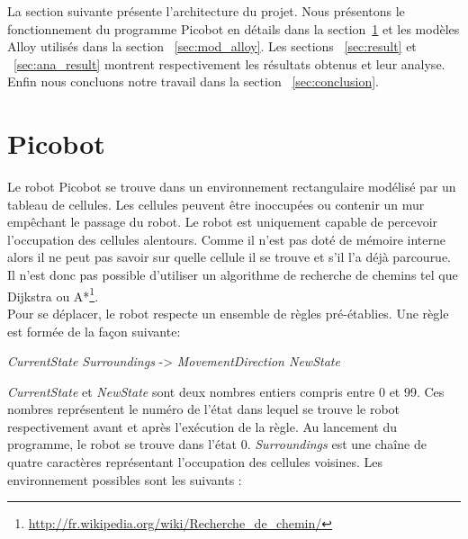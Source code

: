\documentclass{article}
\begin{document}
La section suivante présente l’architecture du projet. Nous présentons le fonctionnement du programme Picobot en détails dans la section~\ref{sec:picobot} et les modèles Alloy utilisés dans la section ~\ref{sec:mod_alloy}. Les sections ~\ref{sec:result} et ~\ref{sec:ana_result} montrent respectivement les résultats obtenus et leur analyse. Enfin nous concluons notre travail dans la section ~\ref{sec:conclusion}.


\section{Picobot}
\label{sec:picobot}
Le robot Picobot se trouve dans un environnement rectangulaire modélisé par un tableau de cellules. Les cellules peuvent être inoccupées ou contenir un mur empêchant le passage du robot. Le robot est uniquement capable de percevoir l’occupation des cellules alentours. Comme il n’est pas doté de mémoire interne alors il ne peut pas savoir sur quelle cellule il se trouve et s’il l’a déjà parcourue. Il n’est donc pas possible d’utiliser un algorithme de recherche de chemins tel que Dijkstra ou A*\footnote{\label{pathginding_lien}\url{http://fr.wikipedia.org/wiki/Recherche\_de\_chemin/}}.
\\

Pour se déplacer, le robot respecte un ensemble de règles pré-établies. Une règle est formée de la façon suivante:
\begin{center}
\textit{CurrentState Surroundings} -> \textit{MovementDirection NewState}
\end{center}

\textit{CurrentState} et \textit{NewState} sont deux nombres entiers compris entre 0 et 99. Ces nombres représentent le numéro de l’état dans lequel se trouve le robot respectivement avant et après l’exécution de la règle. Au lancement du programme, le robot se trouve dans l’état 0.
\newpage
\textit{Surroundings} est une chaîne de quatre caractères représentant l’occupation des cellules voisines. Les environnement possibles sont les suivants : 
\end{document}
